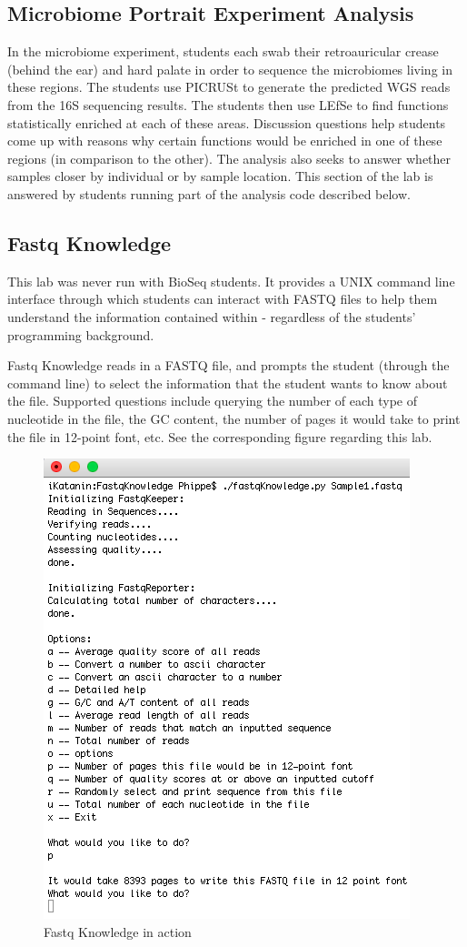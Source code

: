 \documentclass{report}
\begin{document}
\subsection{Microbiome Portrait Experiment Analysis}
In the microbiome experiment, students each swab their retroauricular crease (behind the ear) and hard palate in order to sequence the microbiomes living in these regions. The students use PICRUSt to generate the predicted WGS reads from the 16S sequencing results. The students then use LEfSe to find functions statistically enriched at each of these areas. Discussion questions help students come up with reasons why certain functions would be enriched in one of these regions (in comparison to the other). The analysis also seeks to answer whether samples closer by individual or by sample location. This section of the lab is answered by students running part of the analysis code described below.

\subsection{Fastq Knowledge}
\noindent This lab was never run with BioSeq students. It provides a UNIX command line interface through which students can interact with FASTQ files to help them understand the information contained within - regardless of the students' programming background.

Fastq Knowledge reads in a FASTQ file, and prompts the student (through the command line) to select the information that the student wants to know about the file. Supported questions include querying the number of each type of nucleotide in the file, the GC content, the number of pages it would take to print the file in 12-point font, etc. See the corresponding figure regarding this lab.

\begin{figure}[h]
\centering
\includegraphics[scale=0.75]{fastqK.png}
\caption{Fastq Knowledge in action}
\end{figure}
\end{document}

